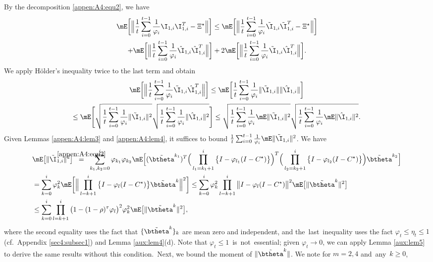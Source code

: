 By the decomposition \eqref{appen:A4:equ2}, we have
\begin{multline}\label{appen:A4:equ23}
\mE\bigg[\Big\|\frac{1}{t}\sum_{i=0}^{t-1}\frac{1}{\varphi_i}\I_{1,i}\I_{1,i}^T-\Xi^\star\Big\|\bigg] \leq \mE\bigg[\Big\|\frac{1}{t}\sum_{i=0}^{t-1}\frac{1}{\varphi_i}\tilde{\I}_{1,i}\tilde{\I}_{1,i}^T-\Xi^\star\Big\|\bigg]\\
+\mE\bigg[\Big\|\frac{1}{t}\sum_{i=0}^{t-1}\frac{1}{\varphi_i}\hat{\I}_{1,i}\hat{\I}_{1,i}^T\Big\|\bigg] + 2\mE\bigg[\Big\|\frac{1}{t}\sum_{i=0}^{t-1}\frac{1}{\varphi_i}\tilde{\I}_{1,i}\hat{\I}_{1,i}^T\Big\|\bigg].
\end{multline}
We apply H\"older's inequality twice to the last term and obtain
\begin{multline}\label{appen:A4:equ19}
\mE\bigg[\Big\|\frac{1}{t}\sum_{i=0}^{t-1}\frac{1}{\varphi_i}\tilde{\I}_{1,i}\hat{\I}_{1,i}^T\Big\|\bigg]
\leq \mE\bigg[\frac{1}{t}\sum_{i=0}^{t-1}\frac{1}{\varphi_i}\|\tilde{\I}_{1,i}\|\|\hat{\I}_{1,i}\|\bigg]\\
\leq \mE\Bigg[\sqrt{\frac{1}{t}\sum_{i=0}^{t-1}\frac{1}{\varphi_i}\|\tilde{\I}_{1,i}\|^2}\sqrt{\frac{1}{t}\sum_{i=0}^{t-1}\frac{1}{\varphi_i}\|\hat{\I}_{1,i}\|^2}\Bigg]\leq\sqrt{\frac{1}{t}\sum_{i=0}^{t-1}\frac{1}{\varphi_i}\mE\|\tilde{\I}_{1,i}\|^2} \sqrt{\frac{1}{t}\sum_{i=0}^{t-1}\frac{1}{\varphi_i}\mE\|\hat{\I}_{1,i}\|^2}.
\end{multline}
Given Lemmas \ref{appen:A4:lem3} and \ref{appen:A4:lem4}, it suffices to bound $\frac{1}{t}\sum_{i=0}^{t-1}\frac{1}{\varphi_i}\mE\|\tilde{\I}_{1,i}\|^2$. We have
\begin{align}\label{appen:A4:equ4}
&\mE\big[\|\tilde{\I}_{1,i}\|^2\big]\;\; \stackrel{\mathclap{\eqref{appen:A4:equ2}}}{=}\;\; \sum_{k_1,k_2=0}^i\varphi_{k_1}\varphi_{k_2}\mE\Big[(\tilde{\btheta}^{k_1})^T\Big(\prod_{l_1=k_1+1}^i\big\{I-\varphi_{l_1}(I-C^\star)\big\}\Big)^T \Big(\prod_{l_2=k_2+1}^i\big\{I-\varphi_{l_2}(I-C^\star)\big\}\Big) \tilde{\btheta}^{k_2}\Big]\nonumber\\
& = \sum_{k=0}^i\varphi_k^2 \mE\bigg[\Big\|\prod_{l=k+1}^i\big\{I-\varphi_{l}(I-C^\star)\big\}\tilde{\btheta}^k\Big\|^2\bigg] \leq \sum_{k=0}^i\varphi_k^2 \prod_{l=k+1}^i\big\|I-\varphi_{l}(I-C^\star)\big\|^2\mE\big[\|\tilde{\btheta}^k\|^2\big]\nonumber\\
&\leq \sum_{k=0}^i \prod_{l=k+1}^i\big(1-(1-\rho)^\tau\varphi_l\big)^2 \varphi_k^2 \mE\big[\|\tilde{\btheta}^k\|^2\big],
\end{align}
where the second equality uses the fact that $\{\tilde{\btheta}^k\}_k$ are mean zero and  independent, and the~last~inequality uses the fact $\varphi_t\leq \eta_t\leq 1$ (cf.~Appendix \ref{sec4:subsec1}) and Lemma \ref{aux:lem4}(d). Note that $\varphi_t\leq 1$~is~not~essential; given $\varphi_t\rightarrow 0$, we can apply Lemma \ref{aux:lem5} to derive the same results without this condition.~Next, we bound the moment of $\|\tilde{\btheta}^k\|$. We note for $m=2,4$ and~any~$k\geq 0$,

